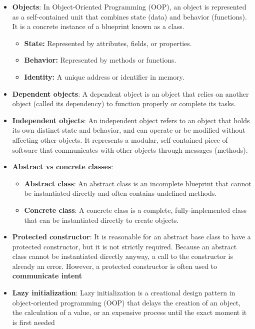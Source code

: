 \documentclass{report}
\begin{document}
\begin{itemize}
\begin{itemize}
            \end{itemize}
        \item \textbf{Objects}: In Object-Oriented Programming (OOP), an object is represented as a self-contained unit that combines state (data) and behavior (functions). It is a concrete instance of a blueprint known as a class.
            \begin{itemize}
                \item \textbf{State:} Represented by attributes, fields, or properties.
                \item \textbf{Behavior:} Represented by methods or functions.
                \item \textbf{Identity:} A unique address or identifier in memory.
            \end{itemize}
        \item \textbf{Dependent objects}: A dependent object is an object that relies on another object (called its dependency) to function properly or complete its tasks. 
        \item \textbf{Independent objects}: An independent object refers to an object that holds its own distinct state and behavior, and can operate or be modified without affecting other objects. It represents a modular, self-contained piece of software that communicates with other objects through messages (methods). 
        \item \textbf{Abstract vs concrete classes}: 
            \begin{itemize}
                \item \textbf{Abstract class}: An abstract class is an incomplete blueprint that cannot be instantiated directly and often contains undefined methods. 
                \item \textbf{Concrete class}: A concrete class is a complete, fully-implemented class that can be instantiated directly to create objects.
            \end{itemize}
        \item \textbf{Protected constructor}: It is reasonable for an abstract base class to have a protected constructor, but it is not strictly required. Because an abstract class cannot be instantiated directly anyway, a call to the constructor is already an error.
            \bigbreak \noindent 
            However, a protected constructor is often used to \textbf{communicate intent}
        \item \textbf{Lazy initialization}: Lazy initialization is a creational design pattern in object-oriented programming (OOP) that delays the creation of an object, the calculation of a value, or an expensive process until the exact moment it is first needed

\end{itemize}
\end{document}
